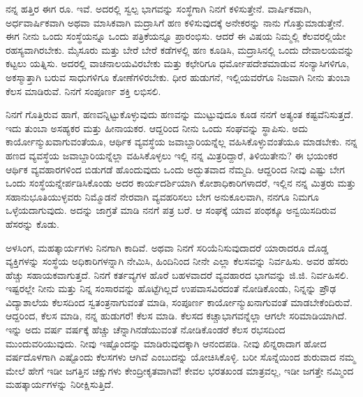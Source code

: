 \vspace{0.2cm}

ನನ್ನ ಹತ್ತಿರ ಈಗ ರೂ.  ಇವೆ. ಅದರಲ್ಲಿ ಸ್ವಲ್ಪ ಭಾಗವನ್ನು ಸಂಸ್ಥೆಗಾಗಿ ನಿನಗೆ ಕಳಿಸುತ್ತೇನೆ. ವಾರ್ಷಿಕವಾಗಿ, ಅರ್ಧವಾರ್ಷಿಕವಾಗಿ ಅಥವಾ ಮಾಸಿಕವಾಗಿ ಮದ್ರಾಸಿಗೆ ಹಣ ಕಳಿಸುವುದಕ್ಕೆ ಅನೇಕರನ್ನು ನಾನು ಗೊತ್ತುಮಾಡುತ್ತೇನೆ. ಈಗ ನೀನು ಒಂದು ಸಂಸ್ಥೆಯನ್ನೂ ಒಂದು ಪತ್ರಿಕೆಯನ್ನೂ ಪ್ರಾರಂಭಿಸು. ಆದರೆ ಈ ವಿಷಯ ನಿಮ್ಮಲ್ಲಿ ಕೆಲವರಲ್ಲಿಯೇ ರಹಸ್ಯವಾಗಿರಬೇಕು. ಮೈಸೂರು ಮತ್ತು ಬೇರೆ ಬೇರೆ ಕಡೆಗಳಲ್ಲಿ ಹಣ ಕೂಡಿಸಿ, ಮದ್ರಾಸಿನಲ್ಲಿ ಒಂದು ದೇವಾಲಯವನ್ನು ಕಟ್ಟಲು ಯತ್ನಿಸು. ಅದರಲ್ಲಿ ವಾಚನಾಲಯವಿರಬೇಕು ಮತ್ತು ಕಛೇರಿಗೂ ಧರ್ಮೋಪದೇಶಮಾಡುವ ಸಂನ್ಯಾಸಿಗಳಿಗೂ, ಅಕಸ್ಮಾತ್ತಾಗಿ ಬರುವ ಸಾಧುಗಳಿಗೂ ಕೋಣೆಗಳಿರಬೇಕು. ಧೀರ ಹುಡುಗನೆ, ಇಲ್ಲಿಯವರೆಗೂ ನಿಜವಾಗಿ ನೀನು ತುಂಬಾ ಕೆಲಸ ಮಾಡಿರುವೆ. ನಿನಗೆ ಸಂಪೂರ್ಣ ಶಕ್ತಿ ಲಭಿಸಲಿ.

\vspace{0.2cm}

ನಿನಗೆ ಗೊತ್ತಿರುವ ಹಾಗೆ, ಹಣವನ್ನಿಟ್ಟುಕೊಳ್ಳುವುದು ಹಣವನ್ನು ಮುಟ್ಟುವುದೂ ಕೂಡ ನನಗೆ ಅತ್ಯಂತ ಕಷ್ಟವೆನಿಸುತ್ತದೆ. ಇದು ತುಂಬಾ ಅಸಹ್ಯಕರ ಮತ್ತು ಹೀನಾಯಕರ. ಆದ್ದರಿಂದ ನೀನು ಒಂದು ಸಂಘವನ್ನು ಸ್ಥಾಪಿಸು. ಅದು ಕಾರ್ಯೋನ್ಮುಖವಾಗುವಂತೆಯೂ, ಆರ್ಥಿಕ ವ್ಯವಸ್ಥೆಯ ಜವಾಬ್ದಾರಿಯನ್ನೆಲ್ಲ ವಹಿಸಿಕೊಳ್ಳುವಂತೆಯೂ ಮಾಡಬೇಕು. ನನ್ನ ಹಣದ ವ್ಯವಸ್ಥೆಯ ಜವಾಬ್ದಾರಿಯನ್ನೆಲ್ಲಾ ವಹಿಸಿಕೊಳ್ಳಲು ಇಲ್ಲಿ ನನ್ನ ಮಿತ್ರರಿದ್ದಾರೆ, ತಿಳಿಯಿತೇನು? ಈ ಭಯಂಕರ ಆರ್ಥಿಕ ವ್ಯವಹಾರಗಳಿಂದ ಬಿಡುಗಡೆ ಹೊಂದುವುದು ಒಂದು ಅದ್ಭುತವಾದ ನೆಮ್ಮದಿ. ಆದ್ದರಿಂದ ನೀವು ಎಷ್ಟು ಬೇಗ ಒಂದು ಸಂಸ್ಥೆಯನ್ನೇರ್ಪಡಿಸಿಕೊಂಡು ಅದರ ಕಾರ್ಯದರ್ಶಿಯಾಗಿ ಕೋಶಾಧಿಕಾರಿಗಳಾದರೆ, ಇಲ್ಲಿನ ನನ್ನ ಮಿತ್ರರು ಮತ್ತು ಸಹಾನುಭೂತಿಯುಳ್ಳವರು ನಿಮ್ಮೊಡನೆ ನೇರವಾಗಿ ವ್ಯವಹರಿಸಲು ಬೇಗ ಅನುಕೂಲವಾಗಿ, ನನಗೂ ನಿಮಗೂ ಒಳ್ಳೆಯದಾಗುವುದು. ಅದನ್ನು ಜಾಗ್ರತೆ ಮಾಡಿ ನನಗೆ ಪತ್ರ ಬರೆ. ಆ ಸಂಘಕ್ಕೆ ಯಾವ ಪಂಥಕ್ಕೂ ಅನ್ವಯಿಸದಿರುವ ಹೆಸರನ್ನು ಕೊಡು.

\vspace{0.2cm}

ಅಳಸಿಂಗ, ಮಹತ್ಕಾರ್ಯಗಳು ನಿನಗಾಗಿ ಕಾದಿವೆ. ಅಥವಾ ನಿನಗೆ ಸರಿಯೆನಿಸುವುದಾದರೆ ಯಾರಾದರೂ ದೊಡ್ಡ ವ್ಯಕ್ತಿಗಳನ್ನು ಸಂಸ್ಥೆಯ ಅಧಿಕಾರಿಗಳನ್ನಾಗಿ ನೇಮಿಸಿ, ಹಿಂದಿನಿಂದ ನೀನೇ ಎಲ್ಲಾ ಕೆಲಸವನ್ನು ನಿರ್ವಹಿಸು. ಅವರ ಹೆಸರು ಹೆಚ್ಚು ಸಹಾಯಕವಾಗುತ್ತದೆ. ನಿನಗೆ ಕರ್ತವ್ಯಗಳ ಹೊರೆ ಬಹಳವಾದರೆ ವ್ಯವಹಾರದ ಭಾಗವನ್ನು ಜಿ.ಜಿ. ನಿರ್ವಹಿಸಲಿ. ಇಷ್ಟರಲ್ಲೇ ನೀನು ಮತ್ತು ನಿನ್ನ ಸಂಸಾರವನ್ನು ಹೊಟ್ಟೆಗಿಲ್ಲದೆ ಉಪವಾಸವಿರದಂತೆ ನೋಡಿಕೊಂಡು, ನಿನ್ನನ್ನು ಪ್ರೌಢ ವಿದ್ಯಾಶಾಲೆಯ ಕೆಲಸದಿಂದ ಸ್ವತಂತ್ರನಾಗುವಂತೆ ಮಾಡಿ, ಸಂಪೂರ್ಣ ಕಾರ್ಯೋನ್ಮುಖನಾಗುವಂತೆ ಮಾಡಬೇಕೆಂದಿರುವೆ. ಆದ್ದರಿಂದ, ಕೆಲಸ ಮಾಡಿ, ನನ್ನ ಹುಡುಗರೆ! ಕೆಲಸ ಮಾಡಿ. ಕೆಲಸದ ಕಚ್ಚಾಭಾಗವನ್ನೆಲ್ಲಾ ಆಗಲೇ ಸರಿಮಾಡಿಯಾಗಿದೆ. ಇನ್ನು ಅದು ವರ್ಷ ವರ್ಷಕ್ಕೆ ಹೆಚ್ಚು ಚೆನ್ನಾಗಿನಡೆಯುವಂತೆ ನೋಡಿಕೊಂಡರೆ ಕೆಲಸ ರಭಸದಿಂದ ಮುಂದುವರಿಯುವುದು. ನೀವು ಇಷ್ಟೊಂದನ್ನು ಮಾಡಿರುವುದಕ್ಕಾಗಿ ಆನಂದಪಡಿ. ನೀವು ಖಿನ್ನರಾದಾಗ ಹೋದ ವರ್ಷದೊಳಗಾಗಿ ಎಷ್ಟೊಂದು ಕೆಲಸಗಳು ಆಗಿವೆ ಎಂಬುದನ್ನು ಯೋಚಿಸಿಕೊಳ್ಳಿ. ಬರೀ ಸೊನ್ನೆಯಿಂದ ಶುರುವಾದ ನಮ್ಮ ಮೇಲೆ ಹೇಗೆ ಇಡೀ ಜಗತ್ತಿನ ಚಕ್ಷುಗಳು ಕೇಂದ್ರೀಕೃತವಾಗಿವೆ! ಕೇವಲ ಭರತಖಂಡ ಮಾತ್ರವಲ್ಲ, ಇಡೀ ಜಗತ್ತೇ ನಮ್ಮಿಂದ ಮಹತ್ಕಾರ್ಯಗಳನ್ನು ನಿರೀಕ್ಷಿಸುತ್ತಿದೆ.

